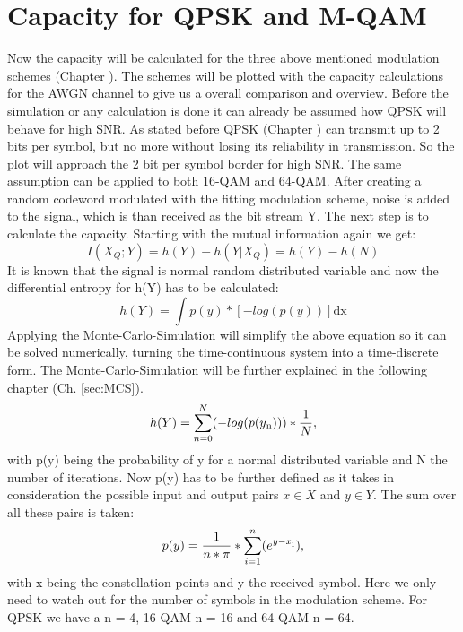 \section{Capacity for QPSK and M-QAM}
Now the capacity will be calculated for the three above mentioned modulation schemes (Chapter ). The schemes will be plotted with the capacity calculations for the AWGN channel to give us a overall comparison and overview.
\newline
Before the simulation or any calculation is done it can already be assumed how QPSK will behave for high SNR. As stated before QPSK (Chapter ) can transmit up to 2 bits per symbol, but no more without losing its reliability in transmission. So the plot will approach the 2 bit per symbol border for high SNR. The same assumption can be applied to both 16-QAM and 64-QAM.
After creating a random codeword modulated with the fitting modulation scheme, noise is added to the signal, which is than received as the bit stream Y. The next step is to calculate the capacity. 
\newline
Starting with the mutual information again we get:
\begin{equation}
I(X_Q;Y) = h(Y) - h(Y|X_Q) = h(Y) - h(N)
\end{equation}
It is known that the signal is normal random distributed variable and now the differential entropy for h(Y) has to be calculated: 
\begin{equation}
h(Y) = \int p(y) * [-log(p(y))] \mathrm{dx}
\end{equation}
Applying the Monte-Carlo-Simulation will simplify the above equation so it can be solved numerically, turning the time-continuous system into a time-discrete form. The Monte-Carlo-Simulation will be further explained in the following chapter (Ch. \ref{sec:MCS}).
\begin{equation}
\label{eq:entropy1}
h(Y) =  \sum_{n=0}^N(-log(p(y\textsubscript{n}))) * \frac{1}{N},
\end{equation} 
with p(y) being the probability of y for a normal distributed variable and N the number of iterations. Now p(y) has to be further defined as it takes in consideration the possible input and output pairs $x \in X$ and $y \in Y$. The sum over all these pairs is taken:
\begin{equation}
\label{eq:entropy2}
p(y) = \frac{1}{n*\pi}*\sum_{i=1}^n(e^{y-x\textsubscript{i}}),
\end{equation} 
with x being the constellation points and y the received symbol.
Here we only need to watch out for the number of symbols in the modulation scheme. For QPSK we have a n = 4, 16-QAM n = 16 and 64-QAM n = 64.
\newline
